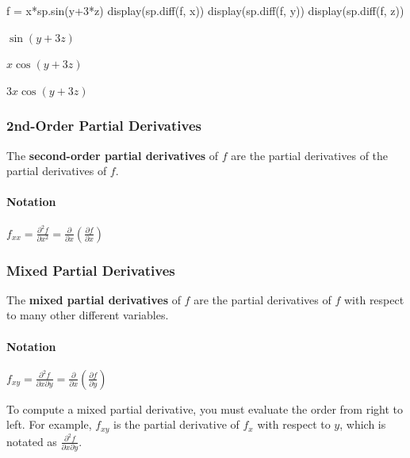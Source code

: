 \documentclass[
  letterpaper,
  DIV=11,
  numbers=noendperiod]{scrartcl}
\let\oldparagraph\paragraph
\renewcommand{\paragraph}[1]{\oldparagraph{#1}\mbox{}}
\newenvironment{Shaded}{\begin{snugshade}}{\end{snugshade}}
\newcommand{\DecValTok}[1]{\textcolor[rgb]{0.68,0.00,0.00}{#1}}
\newcommand{\NormalTok}[1]{\textcolor[rgb]{0.00,0.23,0.31}{#1}}
\newcommand{\OperatorTok}[1]{\textcolor[rgb]{0.37,0.37,0.37}{#1}}
\begin{document}
\begin{Shaded}
\begin{Highlighting}[numbers=left,,]
\NormalTok{f }\OperatorTok{=}\NormalTok{ x}\OperatorTok{*}\NormalTok{sp.sin(y}\OperatorTok{+}\DecValTok{3}\OperatorTok{*}\NormalTok{z)}
\NormalTok{display(sp.diff(f, x))}
\NormalTok{display(sp.diff(f, y))}
\NormalTok{display(sp.diff(f, z))}
\end{Highlighting}
\end{Shaded}

$\displaystyle \sin{\left(y + 3 z \right)}$

$\displaystyle x \cos{\left(y + 3 z \right)}$

$\displaystyle 3 x \cos{\left(y + 3 z \right)}$

\subsubsection{2nd-Order Partial
Derivatives}\label{nd-order-partial-derivatives}

The \textbf{second-order partial derivatives} of \(f\) are the partial
derivatives of the partial derivatives of \(f\).

\paragraph{Notation}\label{notation-1}

\(f_{xx} = \frac{\partial^2 f}{\partial x^2} = \frac{\partial}{\partial x}\left(\frac{\partial f}{\partial x}\right)\)

\subsubsection{Mixed Partial
Derivatives}\label{mixed-partial-derivatives}

The \textbf{mixed partial derivatives} of \(f\) are the partial
derivatives of \(f\) with respect to many other different variables.

\paragraph{Notation}\label{notation-2}

\(f_{xy} = \frac{\partial^2 f}{\partial x \partial y} = \frac{\partial}{\partial x}\left(\frac{\partial f}{\partial y}\right)\)

To compute a mixed partial derivative, you must evaluate the order from
right to left. For example, \(f_{xy}\) is the partial derivative of
\(f_x\) with respect to \(y\), which is notated as
\(\frac{\partial^2 f}{\partial x \partial y}\).
\end{document}
